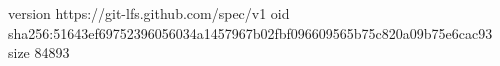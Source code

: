 version https://git-lfs.github.com/spec/v1
oid sha256:51643ef69752396056034a1457967b02fbf096609565b75c820a09b75e6cac93
size 84893
